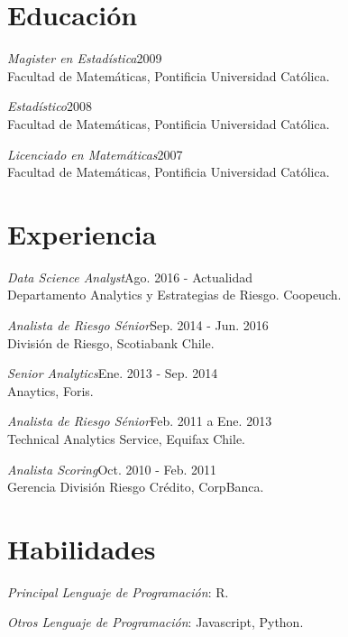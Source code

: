 \documentclass[margin]{res}
\begin{document}
\begin{resume}

\section{Educación}

    {\sl Magister en Estadística}\hfill 2009\\
    Facultad de Matemáticas, Pontificia Universidad Católica.

    {\sl Estadístico}\hfill 2008\\
    Facultad de Matemáticas, Pontificia Universidad Católica.

    {\sl Licenciado en Matemáticas}\hfill 2007\\
    Facultad de Matemáticas, Pontificia Universidad Católica.

\vspace{1cm}

\section{Experiencia}

    {\sl Data Science Analyst}\hfill Ago. 2016 - Actualidad\\
        Departamento Analytics y Estrategias de Riesgo. Coopeuch.

    {\sl Analista de Riesgo Sénior}\hfill Sep. 2014 - Jun. 2016\\
        División de Riesgo, Scotiabank Chile.

    {\sl Senior Analytics}\hfill Ene. 2013 - Sep. 2014\\
    Anaytics, Foris.

    {\sl Analista de Riesgo Sénior}\hfill Feb. 2011 a Ene. 2013\\
    Technical Analytics Service, Equifax Chile.

    {\sl Analista Scoring}\hfill Oct. 2010 - Feb. 2011\\
    Gerencia División Riesgo Crédito, CorpBanca.

\vspace{1cm}

\section{Habilidades}

    {\sl Principal Lenguaje de Programación}: R.
    
    {\sl Otros Lenguaje de Programación}: Javascript, Python.


\end{resume}
\end{document}
